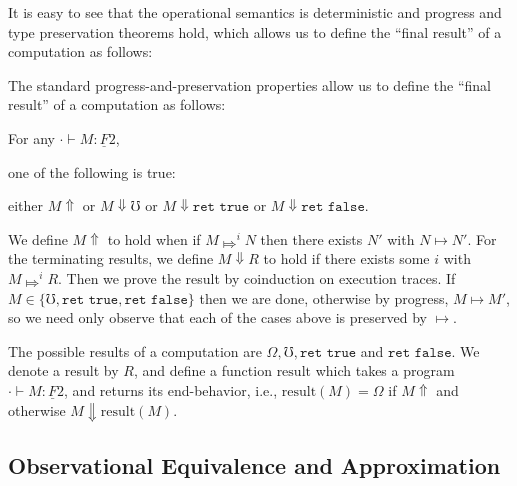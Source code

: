 \documentclass[acmsmall,screen,12pt]{acmart}
\renewcommand{\u}{\underline}
\newcommand{\step}{\mapsto}
\newcommand{\bigstepsin}[1]{\mathrel{\Mapsto^{#1}}}
\newcommand{\tru}{\texttt{true}}
\newcommand{\fls}{\texttt{false}}
\newcommand{\err}{\mho}
\newcommand{\diverge}{\Omega}
\newcommand{\result}{\text{result}}
\newcommand{\kw}[1]{\texttt{#1}\,\,}
\newcommand{\ret}{\kw{ret}}
\begin{document}
{\begin{shortonly}
  It is easy to see that the operational semantics is deterministic
  and progress and type preservation theorems hold, which allows us to
  define the ``final result'' of a computation as follows:
\end{shortonly}
\begin{longonly}
The standard progress-and-preservation properties allow us to define
 the ``final result'' of a computation as follows:
\end{longonly}
\begin{corollary}
  For any $\cdot \vdash M : \u F 2$,
  \begin{longonly}
    one of the following is true:
  \end{longonly}
  \begin{shortonly}
    either $M \Uparrow$ or $M \Downarrow \err$ or $M \Downarrow \ret
    \tru$ or  $M \Downarrow \ret \fls$.
  \end{shortonly}
\end{corollary}
\begin{longproof}
  We define $M \Uparrow$ to hold when if $M \bigstepsin{i} N$ then
  there exists $N'$ with $N \step N'$. For the terminating results, we
  define $M \Downarrow R$ to hold if there exists some $i$ with $M
  \bigstepsin{i} R$. Then we prove the result by coinduction on
  execution traces. If $M \in \{ \err, \ret\tru, \ret\fls \}$ then we
  are done, otherwise by progress, $M \step M'$, so we need only
  observe that each of the cases above is preserved by $\step$.
\end{longproof}
\begin{definition}[Results]
   The possible results of a computation are $ \diverge, \err,
   \ret \tru$ and $\ret \fls$. We denote a result by $R$, and define a
   function $\result$ which takes a program $\cdot \vdash M : \u F 2$,
   and returns its end-behavior, i.e., $\result(M)= \diverge$ if $M
   \Uparrow$ and otherwise $M \Downarrow \result(M)$.
\end{definition}

\subsection{Observational Equivalence and Approximation}
\label{sec:obs-equiv-approx}

}
\end{document}
